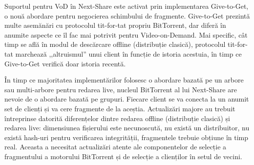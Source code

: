 Suportul pentru VoD în Next-Share este activat prin implementarea Give-to-Get,
o nouă abordare pentru negocierea schimbului de fragmente. Give-to-Get prezintă
multe asemănări cu protocolul tit-for-tat propriu BitTorrent, dar diferă în anumite
aspecte ce îl fac mai potrivit pentru Video-on-Demand. Mai specific, cât timp se
află în modul de descărcare offline (distribuție clasică), protocolul tit-for-tat
marchează ,,altruismul'' unui client în funcție de istoria acestuia, în timp ce
Give-to-Get verifică doar istoria recentă.

În timp ce majoritatea implementărilor folosesc o abordare bazată pe un arbore
sau multi-arbore pentru redarea live, nucleul BitTorrent al lui Next-Share
are nevoie de o abordare bazată pe grupuri. Fiecare client se va conecta la
un anumit set de clienți și va cere fragmente de la aceștia. Actualizări
majore au trebuit întreprinse datorită diferențelor dintre redarea offline
(distribuție clasică) și redarea live: dimensiunea fișierului este necunoscută,
nu există un distribuitor, nu există hash-uri pentru verificarea integrității,
fragmentele trebuie obțiune în timp real. Aceasta a necesitat actualizări
atente ale componentelor de selecție a fragmentului a motorului BitTorrent și
de selecție a clienților în setul de vecini.

